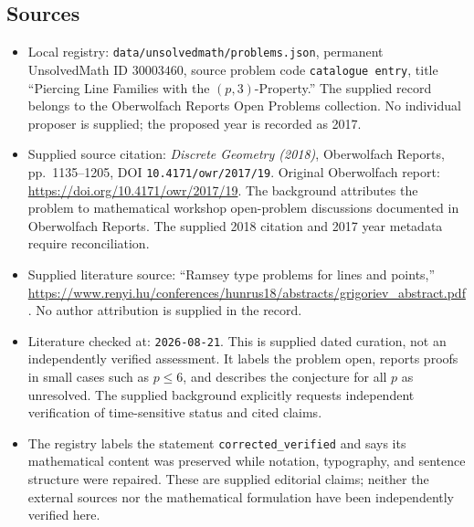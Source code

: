 \documentclass[11pt]{article}
\begin{document}
\subsection{Sources}
\begin{itemize}
\item Local registry: \texttt{data/unsolvedmath/problems.json}, permanent UnsolvedMath ID \(30003460\), source problem code \texttt{catalogue entry}, title ``Piercing Line Families with the \((p,3)\)-Property.'' The supplied record belongs to the Oberwolfach Reports Open Problems collection. No individual proposer is supplied; the proposed year is recorded as 2017.
\item Supplied source citation: \emph{Discrete Geometry (2018)}, Oberwolfach Reports, pp.~1135--1205, DOI \texttt{10.4171/owr/2017/19}. Original Oberwolfach report: \url{https://doi.org/10.4171/owr/2017/19}. The background attributes the problem to mathematical workshop open-problem discussions documented in Oberwolfach Reports. The supplied 2018 citation and 2017 year metadata require reconciliation.
\item Supplied literature source: ``Ramsey type problems for lines and points,'' \url{https://www.renyi.hu/conferences/hunrus18/abstracts/grigoriev_abstract.pdf}. No author attribution is supplied in the record.
\item Literature checked at: \texttt{2026-08-21}. This is supplied dated curation, not an independently verified assessment. It labels the problem open, reports proofs in small cases such as \(p\leq6\), and describes the conjecture for all \(p\) as unresolved. The supplied background explicitly requests independent verification of time-sensitive status and cited claims.
\item The registry labels the statement \texttt{corrected\_verified} and says its mathematical content was preserved while notation, typography, and sentence structure were repaired. These are supplied editorial claims; neither the external sources nor the mathematical formulation have been independently verified here.
\end{itemize}
\end{document}
